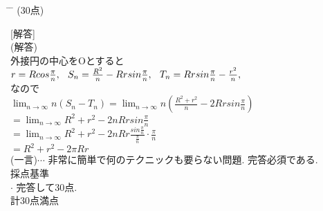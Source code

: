 \documentclass{article}
\begin{document}
\newpage
\begin{tabbing}
\hspace{0.91\textwidth} \= \hspace{0.8\textwidth} \= \kill
\textsf{}\> (30点)\>\\
\end{tabbing}
[{\large 解答}]\vspace{0.1in}\\
(解答)\vspace{0.1in}\\
外接円の中心をOとすると\vspace{0.1in}\\
$r=Rcos\frac{\pi}{n}, \hspace{0.1in} S_n=\frac{R^2}{n}-Rrsin\frac{\pi}{n}, \hspace{0.1in} T_n=Rrsin\frac{\pi}{n}-\frac{r^2}{n},$\vspace{0.1in}\\
なので\vspace{0.1in}\\
$\displaystyle \lim_{n\to \infty}n(S_n-T_n)=\displaystyle \lim_{n\to \infty}n(\frac{R^2+r^2}{n}-2Rrsin\frac{\pi}{n})$\vspace{0.1in}\\
\hspace{0.99in} $=\displaystyle \lim_{n\to \infty}R^2+r^2-2nRrsin\frac{\pi}{n}$\vspace{0.1in}\\
\hspace{0.99in} $=\displaystyle \lim_{n\to \infty}R^2+r^2-2nRr\frac{sin\frac{\pi}{n}}{\frac{\pi}{n}}\cdot \frac{\pi}{n}$\vspace{0.1in}\\
\hspace{0.99in} $=R^2+r^2-2\pi Rr$\vspace{0.1in}\\
  (一言)$\cdots$ 非常に簡単で何のテクニックも要らない問題. 完答必須である.\vspace{0.2in}\\
   {\Large 採点基準}\vspace{0.1in}\\
 $\cdot$ 完答して30点. \vspace{0.1in}\\
計30点満点
\end{document}
